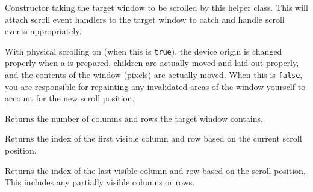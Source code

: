 
Constructor taking the target window to be scrolled by this helper class.
This will attach scroll event handlers to the target window to catch and
handle scroll events appropriately.


\label{wxvarhvscrollhelperenablephysicalscrolling}


With physical scrolling on (when this is {\tt true}), the device origin is
changed properly when a \rtfsp{} is prepared,
children are actually moved and laid out properly, and the contents of the
window (pixels) are actually moved. When this is {\tt false}, you are
responsible for repainting any invalidated areas of the window yourself to
account for the new scroll position.





\label{wxvarhvscrollhelpergetrowcolumncount}


Returns the number of columns and rows the target window contains.




\label{wxvarhvscrollhelpergetvisiblebegin}


Returns the index of the first visible column and row based on the current
scroll position.


\label{wxvarhvscrollhelpergetvisibleend}


Returns the index of the last visible column and row based on the scroll
position. This includes any partially visible columns or rows.


